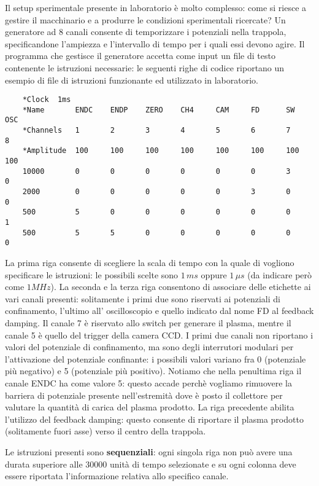 Il setup sperimentale presente in laboratorio è molto complesso: come si riesce a gestire il macchinario e a produrre le 
condizioni sperimentali ricercate? Un generatore ad 8 canali consente di temporizzare i potenziali nella trappola, specificandone 
l'ampiezza e l'intervallo di tempo per i quali essi devono agire. Il programma che gestisce il generatore accetta come input un
file di testo contenente le istruzioni necessarie: le seguenti righe di codice riportano un esempio di file di istruzioni
funzionante ed utilizzato in laboratorio. 
\begin{verbatim}
    *Clock	1ms							
    *Name	    ENDC	ENDP	ZERO	CH4	    CAM	    FD	    SW	    OSC
    *Channels	1	    2	    3	    4	    5	    6	    7	    8
    *Amplitude	100	    100	    100	    100	    100 	100	    100 	100
    10000	    0	    0	    0	    0	    0	    0	    3	    0
    2000	    0	    0	    0	    0	    0	    3	    0 	    0
    500	        5	    0	    0	    0	    0	    0	    0	    1
    500	        5	    5	    0	    0	    0	    0	    0	    0
\end{verbatim}
La prima riga consente di scegliere la scala di tempo con la quale di vogliono specificare le istruzioni: le possibili scelte
sono $1\,ms$ oppure $1\,\mu s$ (da indicare però come $1MHz$). La seconda e la terza riga consentono di associare delle
etichette ai vari canali presenti: solitamente i primi due sono riservati ai potenziali di confinamento, l'ultimo all'
oscilloscopio e quello indicato dal nome FD al feedback damping. Il canale 7 è riservato allo switch per generare il plasma, 
mentre il canale 5 è quello del trigger della camera CCD.
I primi due canali non riportano i valori del potenziale di confinamento, ma sono degli interrutori modulari per l'attivazione
del potenziale confinante: i possibili valori variano fra 0 (potenziale più negativo) e 5 (potenziale più positivo). Notiamo 
che nella penultima riga il canale ENDC ha come valore 5: questo accade perchè vogliamo rimuovere la barriera di potenziale
presente nell'estremità dove è posto il collettore per valutare la quantità di carica del plasma prodotto. La riga precedente
abilita l'utilizzo del feedback damping: questo consente di riportare il plasma prodotto (solitamente fuori asse) verso il 
centro della trappola.

Le istruzioni presenti sono \textbf{sequenziali}: ogni singola riga non può avere una durata superiore alle 30000 unità
di tempo selezionate e su ogni colonna deve essere riportata l'informazione relativa allo specifico canale.\\

